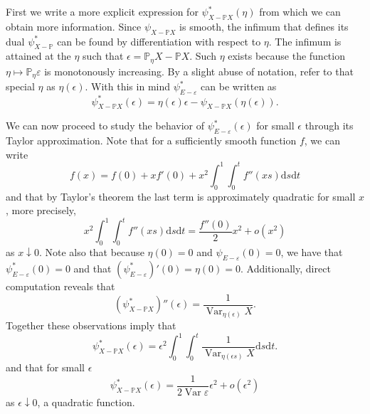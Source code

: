 \documentclass{uvamath}
\newcommand*{\bbP}{\mathbb{P}}
\newcommand*{\rmd}{\mathrm{d}}
\DeclareMathOperator{\var}{Var}
\theoremstyle{remark}
\theoremstyle{definition}
\theoremstyle{definition}
\theoremstyle{definition}
\theoremstyle{definition}
\theoremstyle{definition}
\begin{document}
\begin{appendices}
First we write a more explicit expression for
$\psi^*_{X-\bbP X}(\eta)$ from which we can obtain more
information. Since $\psi_{X-\bbP X}$ is smooth, the infimum that
defines its dual $\psi^*_{X-\bbP}$ can be found by
differentiation with respect to $\eta$. The infimum is attained at the
$\eta$ such that
$\epsilon =  \bbP_{\eta}X-\bbP X $. Such $\eta$
exists because the function $\eta\mapsto\bbP_\eta\varepsilon$ is
monotonously increasing. By a slight abuse of notation, refer to that
special $\eta$ as $\eta(\epsilon)$. With this in mind
$\psi_{E-\varepsilon}^*$ can be written as
\begin{equation*}
  \psi_{X-\bbP X}^*(\epsilon) = \eta(\epsilon)\epsilon -
  \psi_{X-\bbP X}(\eta(\epsilon)).
\end{equation*}

We can now proceed to study the behavior of
$\psi_{E-\varepsilon}^*(\epsilon)$ for small $\epsilon$ through its
Taylor approximation. Note that for a sufficiently smooth function
$f$, we can write
\begin{equation*}
  f(x) =  f(0) + xf'(0)  + x^2\int_0^1\int_0^tf''(xs)\rmd s\rmd t
\end{equation*}
and that by Taylor's theorem the last term is approximately quadratic
for small $x$, more precisely,
\begin{equation*}
  x^2\int_0^1\int_0^tf''(xs)\rmd s\rmd t = \frac{f''(0)}{2}x^2 + o(x^2)
\end{equation*}
as $x\downarrow 0$. Note also that because $\eta(0) = 0$ and
$\psi_{E-\varepsilon}(0) = 0$, we have that
$\psi_{E-\varepsilon}^*(0) = 0$ and that
$(\psi_{E-\varepsilon}^*)'(0) = \eta(0) = 0$. Additionally, direct
computation reveals that
$$(\psi_{X-\bbP X}^*)''(\epsilon) =
\frac{1}{\var_{\eta(\epsilon)}X}.$$
Together these observations imply that
\begin{equation*}
  \psi_{X-\bbP X}^*(\epsilon) = \epsilon^2\int_0^1\int_0^t\frac{1}{\var_{\eta(\epsilon s)}X}\rmd s\rmd t.\end{equation*}
and that for small $\epsilon$
\begin{equation*}
  \psi_{X-\bbP X}^*(\epsilon) = \frac{1}{2\var{\varepsilon}} \epsilon^2 + o(\epsilon^2)
\end{equation*}
as $\epsilon\downarrow 0$, a quadratic function.





\end{appendices}
\end{document}
